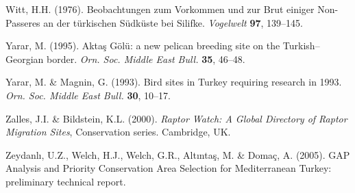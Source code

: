 \documentclass[
  a4paper,
  DIV=11,
  numbers=noendperiod]{scrreprt}
\newlength{\cslhangindent}
\newenvironment{CSLReferences}[2] %
 {\begin{list}{}{%
  \setlength{\itemindent}{0pt}
  \setlength{\leftmargin}{0pt}
  \setlength{\parsep}{0pt}
  \ifodd #1
   \setlength{\leftmargin}{\cslhangindent}
   \setlength{\itemindent}{-1\cslhangindent}
  \fi
  \setlength{\itemsep}{#2\baselineskip}}}
 {\end{list}}
\begin{document}
\begin{CSLReferences}{1}{1}
Witt, H.H. (1976). {Beobachtungen zum Vorkommen und zur Brut einiger
Non-Passeres an der türkischen Südküste bei Silifke}. \emph{Vogelwelt}
\textbf{97}, 139--145.

Yarar, M. (1995). {Aktaş Gölü: a new pelican breeding site on the
Turkish--Georgian border}. \emph{Orn. Soc. Middle East Bull.}
\textbf{35}, 46--48.

Yarar, M. \& Magnin, G. (1993). {Bird sites in Turkey requiring research
in 1993}. \emph{Orn. Soc. Middle East Bull.} \textbf{30}, 10--17.

Zalles, J.I. \& Bildstein, K.L. (2000). \emph{{Raptor Watch: A Global
Directory of Raptor Migration Sites}}, Conservation series. Cambridge,
UK.

Zeydanlı, U.Z., Welch, H.J., Welch, G.R., Altıntaş, M. \& Domaç, A.
(2005). {GAP Analysis and Priority Conservation Area Selection for
Mediterranean Turkey: preliminary technical report}.

\end{CSLReferences}
\end{document}
